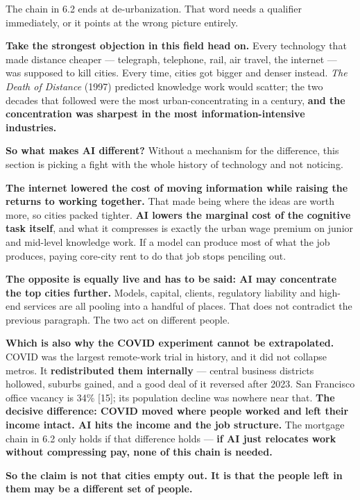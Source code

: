 \documentclass[11pt,a4paper]{article}
\begin{document}
The chain in 6.2 ends at de-urbanization. That word needs a qualifier immediately, or it points at the wrong picture entirely.

\textbf{Take the strongest objection in this field head on.} Every technology that made distance cheaper --- telegraph, telephone, rail, air travel, the internet --- was supposed to kill cities. Every time, cities got bigger and denser instead. \textit{The Death of Distance} (1997) predicted knowledge work would scatter; the two decades that followed were the most urban-concentrating in a century, \textbf{and the concentration was sharpest in the most information-intensive industries.}

\textbf{So what makes AI different?} Without a mechanism for the difference, this section is picking a fight with the whole history of technology and not noticing.

\textbf{The internet lowered the cost of moving information while raising the returns to working together.} That made being where the ideas are worth more, so cities packed tighter. \textbf{AI lowers the marginal cost of the cognitive task itself}, and what it compresses is exactly the urban wage premium on junior and mid-level knowledge work. If a model can produce most of what the job produces, paying core-city rent to do that job stops penciling out.

\textbf{The opposite is equally live and has to be said: AI may concentrate the top cities further.} Models, capital, clients, regulatory liability and high-end services are all pooling into a handful of places. That does not contradict the previous paragraph. The two act on different people.

\textbf{Which is also why the COVID experiment cannot be extrapolated.} COVID was the largest remote-work trial in history, and it did not collapse metros. It \textbf{redistributed them internally} --- central business districts hollowed, suburbs gained, and a good deal of it reversed after 2023. San Francisco office vacancy is 34\% [15]; its population decline was nowhere near that. \textbf{The decisive difference: COVID moved where people worked and left their income intact. AI hits the income and the job structure.} The mortgage chain in 6.2 only holds if that difference holds --- \textbf{if AI just relocates work without compressing pay, none of this chain is needed.}

\textbf{So the claim is not that cities empty out. It is that the people left in them may be a different set of people.}
\end{document}
